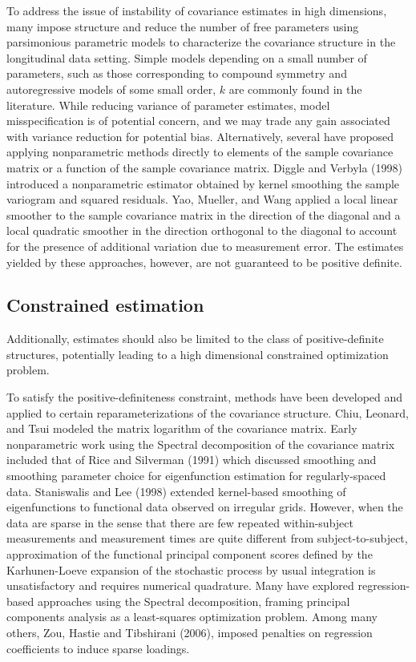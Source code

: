 To address the issue of instability of covariance estimates in high dimensions, many impose structure and reduce the number of free parameters using parsimonious parametric models to characterize the covariance structure in the longitudinal data setting. Simple models depending on a small number of parameters, such as those corresponding to compound symmetry and autoregressive models of some small order, $k$ are commonly found in the literature. While reducing variance of parameter estimates, model misspecification is of potential concern, and we may trade any gain associated with variance reduction for potential bias. Alternatively, several have proposed applying nonparametric methods directly to elements of the sample covariance matrix or a function of the sample covariance matrix. Diggle and Verbyla (1998) introduced a nonparametric estimator obtained by kernel smoothing the sample variogram and squared residuals.  Yao, Mueller, and Wang applied a local linear smoother to the sample covariance matrix in the direction of the diagonal and a local quadratic smoother in the direction orthogonal to the diagonal to account for the presence of additional variation due to measurement error. The estimates yielded by these approaches, however, are not guaranteed to be positive definite. 


\subsection{Constrained estimation}
Additionally, estimates should also be limited to the class of positive-definite structures, potentially leading to a high dimensional constrained optimization problem. 
 
To satisfy the positive-definiteness constraint, methods have been developed and applied to certain reparameterizations of the covariance structure. Chiu, Leonard, and Tsui modeled the matrix logarithm of the covariance matrix. Early nonparametric work using the Spectral decomposition of the covariance matrix included that of Rice and Silverman (1991) which discussed smoothing and smoothing parameter choice for eigenfunction estimation for regularly-spaced data. Staniswalis and Lee (1998) extended kernel-based smoothing of eigenfunctions to functional data observed on irregular grids. However, when the data are sparse in the sense that there are few repeated within-subject measurements and measurement times are quite different from subject-to-subject, approximation of the functional principal component scores defined by the Karhunen-Loeve expansion of the stochastic process by usual integration is unsatisfactory and requires numerical quadrature. Many have explored regression-based approaches using the Spectral decomposition, framing principal components analysis as a least-squares optimization problem. Among many others, Zou, Hastie and Tibshirani (2006), imposed penalties on regression coefficients to induce sparse loadings. 

